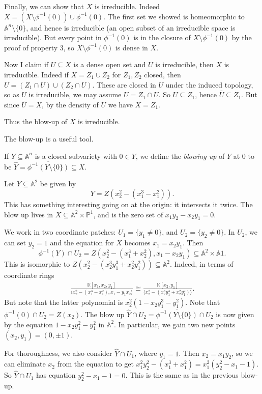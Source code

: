 \documentclass[12pt]{article}
\begin{document}
\begin{exbox}
	Finally, we can show that $X$ is irreducible. Indeed $X = (X \setminus \phi^{-1}(0)) \cup \phi^{-1}(0)$. The first set we showed is homeomorphic to $\mathbb{A}^n \setminus \{0\}$, and hence is irreducible (an open subset of an irreducible space is irreducible). But every point in $\phi^{-1}(0)$ is in the closure of $X \setminus \phi^{-1}(0)$ by the proof of property 3, so $X \setminus \phi^{-1}(0)$ is dense in $X$.

	Now I claim if $U \subseteq X$ is a dense open set and $U$ is irreducible, then $X$ is irreducible. Indeed if $X = Z_1 \cup Z_2$ for $Z_1, Z_2$ closed, then $U = (Z_1 \cap U) \cup (Z_2 \cap U)$. These are closed in $U$ under the induced topology, so as $U$ is irreducible, we may assume $U = Z_1 \cap U$. So $U \subseteq Z_1$, hence $\bar U \subseteq Z_1$. But since $\bar U = X$, by the density of $U$ we have $X = Z_1$.

	Thus the blow-up of $X$ is irreducible.
\end{exbox}

The blow-up is a useful tool.

\begin{definition}
	If $Y \subseteq \mathbb{A}^n$ is a closed subvariety with $0 \in Y$, we define the \emph{blowing up} of $Y$ at $0$ to be $\hat Y = \overline{\phi^{-1}(Y \setminus \{0\})} \subseteq X$.
\end{definition}

\begin{exbox}
	Let $Y \subseteq \mathbb{A}^2$ be given by
	\[
	Y = Z(x_2^2 - (x_1^3 - x_1^2)).
	\]
	This has something interesting going on at the origin: it intersects it twice. The blow up lives in $X \subseteq \mathbb{A}^2 \times \mathbb{P}^1$, and is the zero set of $x_1y_2 - x_2y_1 = 0$.

	We work in two coordinate patches: $U_1 = \{y_1 \neq 0\}$, and $U_2 = \{y_2 \neq 0\}$. In $U_2$, we can set $y_2 = 1$ and the equation for $X$ becomes $x_1 = x_2 y_1$. Then
	\[
	\phi^{-1}(Y) \cap U_2 = Z(x_2^2 - (x_1^3+x_2^2),x_1-x_2y_1) \subseteq \mathbb{A}^2 \times \mathbb{A}1.
	\]
	This is isomorphic to $Z(x_2^2 - (x_2^3y_1^3 + x_2^2y_1^2)) \subseteq \mathbb{A}^2$. Indeed, in terms of coordinate rings
	\begin{align*}
		\frac{\mathbb{K}[x_1, x_2, y_1]}{\langle x_2^2 - (x_1^3 - x_1^2), x_1 - y_1x_2\rangle} \cong \frac{\mathbb{K}[x_2, y_1]}{\langle x_2^2 - (x_2^3y_1^3 + x_2^2y_1^2)\rangle}.
	\end{align*}
	But note that the latter polynomial is $x_2^2(1 - x_2y_1^3 - y_1^2).$ Note that $\phi^{-1}(0) \cap U_2 = Z(x_2)$. The blow up $\hat Y \cap U_2 = \overline{\phi^{-1}(Y \setminus \{0\})} \cap U_2$ is now given by the equation $1 - x_2 y_1^2 - y_1^2$ in $\mathbb{A}^2$. In particular, we gain two new points $(x_2, y_1) = (0, \pm 1)$.

	For thoroughness, we also consider $\hat Y \cap U_1$, where $y_1 = 1$. Then $x_2 = x_1 y_2$, so we can eliminate $x_2$ from the equation to get $x_1^2y_2^2 - (x_1^3 + x_1^2) = x_1^2(y_2^2 - x_1 - 1)$. So $\hat Y \cap U_1$ has equation $y_2^2 - x_1 - 1 = 0$. This is the same as in the previous blow-up.
\end{exbox}
\end{document}
